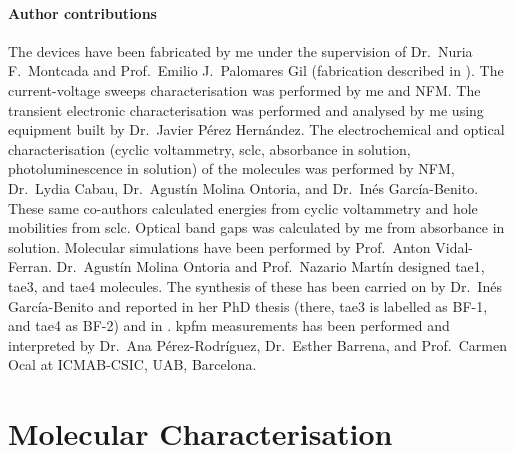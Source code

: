	\paragraph{Author contributions}
	The devices have been fabricated by me under the supervision of Dr.\ Nuria F.\ Montcada and Prof.\ Emilio J.\ Palomares Gil (fabrication described in ).
	The current\hyp{}voltage sweeps characterisation was performed by me and NFM\@.
	The transient electronic characterisation was performed and analysed by me using equipment built by Dr.\ Javier Pérez Hernández.
	The electrochemical and optical characterisation (cyclic voltammetry, \gls{sclc}, absorbance in solution, photoluminescence in solution) of the molecules was performed by NFM, Dr.\ Lydia Cabau, Dr.\ Agustín Molina Ontoria, and Dr.\ Inés García\hyp{}Benito.
	These same co-authors calculated  energies from cyclic voltammetry and hole mobilities from \gls{sclc}.
	Optical band gaps was calculated by me from absorbance in solution.
	Molecular simulations have been performed by Prof.\ Anton Vidal\hyp{}Ferran.
	Dr.\ Agustín Molina Ontoria and Prof.\ Nazario Martín designed \gls{tae1}, \gls{tae3}, and \gls{tae4} molecules.
	The synthesis of these has been carried on by Dr.\ Inés García\hyp{}Benito and reported in her PhD thesis \cite{Garcia-Benito2017} (there, \gls{tae3} is labelled as BF-1, and \gls{tae4} as BF-2) and in \cite{Gelmetti2019}.
	\Gls{kpfm} measurements has been performed and interpreted by Dr.\ Ana Pérez-Rodríguez, Dr.\ Esther Barrena, and Prof.\ Carmen Ocal at ICMAB-CSIC, UAB, Barcelona.


\section{Molecular Characterisation}

